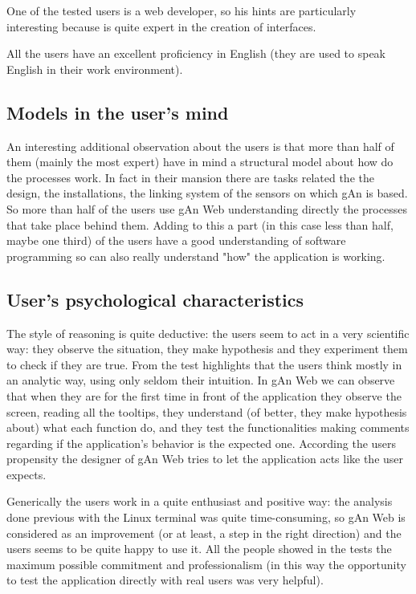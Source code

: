 One of the tested users is a web developer, so his hints are particularly interesting because is quite expert in the creation of interfaces.
 
All the users have an excellent proficiency in English (they are used to speak English in their work environment). 

\subsection{Models in the user's mind}
An interesting additional observation about the users is that more than half of them (mainly the most expert) have in mind a structural model about how do the processes work. In fact in their mansion there are tasks related the the design, the installations, the linking system of the sensors on which gAn is based. So more than half of the users use gAn Web understanding directly the processes that take place behind them. Adding to this a part (in this case less than half, maybe one third) of the users have a good understanding of software programming so can also really understand "how" the application is working.

\subsection{User's psychological characteristics }
The style of reasoning is quite deductive: the users seem to act in a very scientific way: they observe the situation, they make hypothesis and they experiment them to check if they are true. From the test highlights that the users think mostly in an analytic way, using only seldom their intuition. In gAn Web we can observe that when they are for the first time in front of the application they observe the screen, reading all the tooltips, they understand (of better, they make hypothesis about) what each function do, and they test the functionalities making comments regarding if the application's behavior is the expected one. According the users  propensity the designer of gAn Web tries to let the application acts like the user expects.   

Generically the users work in a quite enthusiast and positive way: the analysis done previous with the Linux terminal was quite time-consuming, so gAn Web is considered as an improvement (or at least, a step in the right direction) and the users seems to be quite happy to use it. All the people showed in the tests the maximum possible commitment and professionalism (in this way the opportunity to test the application directly with real users was very helpful).

